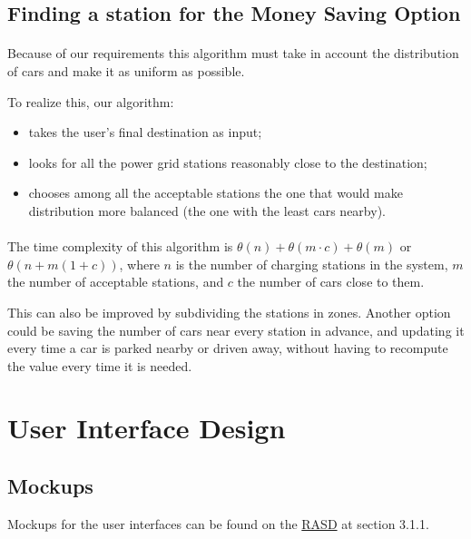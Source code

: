\documentclass[english]{article}
\begin{document}
\newpage
\subsection{Finding a station for the Money Saving Option}



\paragraph{}
Because of our requirements this algorithm must take in account the distribution of cars and make it as uniform as possible.

To realize this, our algorithm:
\begin{itemize}
	\item{takes the user's final destination as input;}
	\item{looks for all the power grid stations reasonably close to the destination;}
	\item{chooses among all the acceptable stations the one that would make distribution more balanced (the one with the least cars nearby).}
\end{itemize}

\paragraph{}
The time complexity of this algorithm is $\theta(n) + \theta(m \cdot c) + \theta(m)$ or $\theta(n + m (1+c))$, where $n$ is the number of charging stations in the system, $m$ the number of acceptable stations, and $c$ the number of cars close to them.

This can also be improved by subdividing the stations in zones.
Another option could be saving the number of cars near every station in advance, and updating it every time a car is parked nearby or driven away, without having to recompute the value every time it is needed.

\newpage

\section{User Interface Design}

\subsection{Mockups}

Mockups for the user interfaces can be found on the \href{https://github.com/PietroFerretti/PowerEnJoy/blob/master/releases/RASD.pdf}{RASD} at section 3.1.1.
\end{document}
